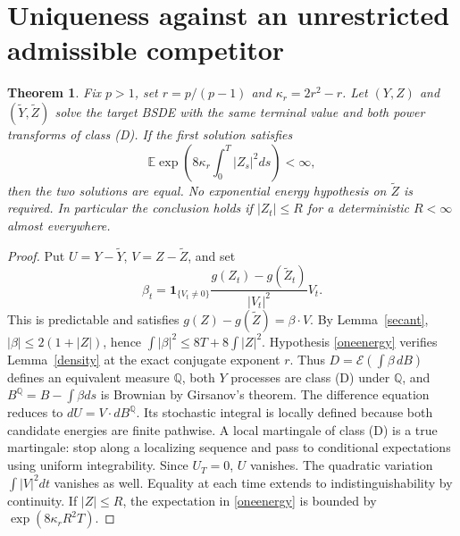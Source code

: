 \documentclass[11pt]{article}
\newtheorem{theorem}{Theorem}
\newcommand{\E}{\mathbb E}
\newcommand{\Q}{\mathbb Q}
\newcommand{\Ind}{\mathbf 1}
\begin{document}
\section{Uniqueness against an unrestricted admissible competitor}
\begin{theorem}\label{weakstrong}
Fix $p>1$, set $r=p/(p-1)$ and $\kappa_r=2r^2-r$.
Let $(Y,Z)$ and $(\widetilde Y,\widetilde Z)$ solve the target BSDE
with the same terminal value and both power transforms of class (D).
If the first solution satisfies
\begin{equation}\label{oneenergy}
 \E\exp\left(8\kappa_r\int_0^T|Z_s|^2ds\right)<\infty,
\end{equation}
then the two solutions are equal. No exponential energy hypothesis on
$\widetilde Z$ is required. In particular the conclusion holds if
$|Z_t|\leq R$ for a deterministic $R<\infty$ almost everywhere.
\end{theorem}
\begin{proof}
Put $U=Y-\widetilde Y$, $V=Z-\widetilde Z$, and set
\[
 \beta_t=\Ind_{\{V_t\ne0\}}
        \frac{g(Z_t)-g(\widetilde Z_t)}{|V_t|^2}V_t.
\]
This is predictable and satisfies
$g(Z)-g(\widetilde Z)=\beta\cdot V$.
By Lemma~\ref{secant}, $|\beta|\leq2(1+|Z|)$, hence
$\int|\beta|^2\leq8T+8\int|Z|^2$.
Hypothesis \eqref{oneenergy} verifies Lemma~\ref{density} at the exact
conjugate exponent $r$. Thus $D=\mathcal E(\int\beta\,dB)$ defines
an equivalent measure $\Q$, both $Y$ processes are class (D) under
$\Q$, and $B^\Q=B-\int\beta ds$ is Brownian by Girsanov's theorem.
The difference equation reduces to
$dU=V\cdot dB^\Q$. Its stochastic integral is locally defined because
both candidate energies are finite pathwise. A local martingale of
class (D) is a true martingale: stop along a localizing sequence and
pass to conditional expectations using uniform integrability.
Since $U_T=0$, $U$ vanishes. The quadratic variation
$\int|V|^2dt$ vanishes as well. Equality at each time extends to
indistinguishability by continuity.
If $|Z|\leq R$, the expectation in \eqref{oneenergy} is bounded by
$\exp(8\kappa_rR^2T)$.
\end{proof}
\end{document}
